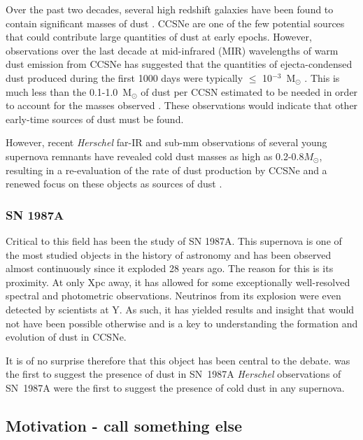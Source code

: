 Over the past two decades, several high redshift galaxies  have been found to contain significant masses of dust \citep{Omont2001, Bertoldi2003, Watson2015}.  CCSNe are one of the few potential sources that could contribute large quantities of dust at early epochs. However, 
observations over the last decade at mid-infrared (MIR) wavelengths of 
warm dust emission from CCSNe has suggested that the quantities of ejecta-condensed dust 
produced during the first 1000 days were typically $\leq$ 10$^{-3}$~M$_\odot$  
\citep{Sugerman2006, Meikle2007, Kotak2009, Andrews2010, Fabbri2011}.  This is much less than the 0.1-1.0~M$_\odot$ of dust per CCSN  
estimated to be needed  in order to account for the masses observed \citep{Morgan2003, Dwek2007}.  These observations would indicate that other early-time sources of dust must be found.

 However, recent {\em Herschel} far-IR and sub-mm observations of  several young supernova remnants have revealed cold dust  masses as high as 
0.2-0.8$M_{\odot}$, resulting in a 
re-evaluation of the rate of dust production by CCSNe and a renewed focus on these objects as sources of dust \citep{Barlow2010, 
Matsuura2011, Gomez2012}.

\subsubsection{SN 1987A}



Critical to this field has been the study of SN 1987A.   This supernova is one of the most studied objects in the history of astronomy and has been observed almost continuously since it exploded 28 years ago.  The reason for this is its proximity.  At only Xpc away, it has allowed for some exceptionally well-resolved spectral and photometric observations.  Neutrinos from its explosion were even detected by scientists at Y.  As such, it has yielded results and insight that would not have been possible otherwise and is a key to understanding the formation and evolution of dust in CCSNe.

It is of no surprise therefore that this object has been central to the debate.  \citet{Lucy1989} was the first to suggest the presence of dust in SN~1987A {\em Herschel} observations of SN~1987A were the first to suggest the presence of cold dust in any supernova.



\subsection{Motivation - call something else}


